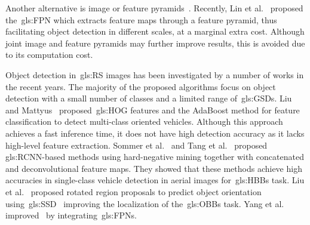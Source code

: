 \documentclass[runningheads]{llncs}
\begin{document}
 Another alternative is image or feature pyramids~\cite{DBLP:journals/corr/PinheiroLCD16,recombinator,laplacian,stacked, fpn,D-FPN}.
    Recently, Lin et al.~\cite{fpn} proposed the~\gls{gls:FPN} which extracts feature maps through a feature pyramid, thus facilitating object detection in different scales, at a marginal extra cost.
	Although joint image and feature pyramids may further improve results, this is avoided due to its computation cost.

    Object detection in~\gls{gls:RS} images has been investigated by a number of works in the recent years.
    The majority of the proposed algorithms focus on object detection with a small number of classes and a limited range of~\glspl{gls:GSD}.
    Liu and Mattyus~\cite{Lui} proposed~\gls{gls:HOG} features and the AdaBoost method for feature classification to detect multi-class oriented vehicles.
    Although this approach achieves a fast inference time, it does not have high detection accuracy as it lacks high-level feature extraction.
    Sommer et al.~\cite{ies_2017_sommer_deep_learning} and Tang et al.~\cite{Tang2017VehicleDI} proposed \gls{gls:RCNN}-based methods using hard-negative mining together with concatenated and deconvolutional feature maps.
    They showed that these methods achieve high accuracies in single-class vehicle detection in aerial images for~\glspl{gls:HBB} task.
    Liu et al.~\cite{DBLP:journals/corr/abs-1711-09405} proposed rotated region proposals to predict object orientation using~\gls{gls:SSD}~\cite{DBLP:conf/eccv/LiuAESRFB16} improving the localization of the~\glspl{gls:OBB} task.
Yang et al.~\cite{XueYang2018} improved~\cite{DBLP:journals/corr/abs-1711-09405} by integrating~\glspl{gls:FPN}.
\end{document}
